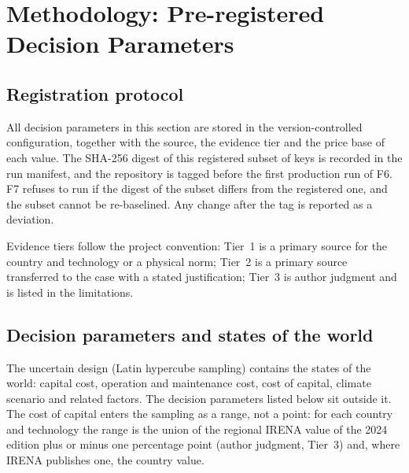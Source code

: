 \section{Methodology: Pre-registered Decision Parameters}
\label{sec:g4-method}

\subsection{Registration protocol}
\label{sec:g4-reg}
All decision parameters in this section are stored in the version-controlled configuration, together with the source, the evidence tier and the price base of each value. The SHA-256 digest of this registered subset of keys is recorded in the run manifest, and the repository is tagged before the first production run of F6. F7 refuses to run if the digest of the subset differs from the registered one, and the subset cannot be re-baselined. Any change after the tag is reported as a deviation. %

Evidence tiers follow the project convention: Tier~1 is a primary source for the country and technology or a physical norm; Tier~2 is a primary source transferred to the case with a stated justification; Tier~3 is author judgment and is listed in the limitations.

\subsection{Decision parameters and states of the world}
The uncertain design (Latin hypercube sampling) contains the states of the world: capital cost, operation and maintenance cost, cost of capital, climate scenario and related factors. The decision parameters listed below sit outside it. The cost of capital enters the sampling as a range, not a point: for each country and technology the range is the union of the regional IRENA value of the 2024 edition plus or minus one percentage point (author judgment, Tier~3) and, where IRENA publishes one, the country value. %

